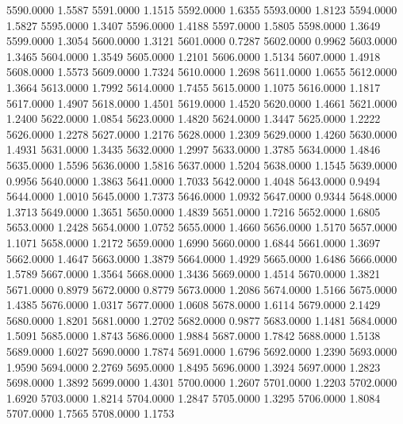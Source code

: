 5590.0000      1.5587
5591.0000      1.1515
5592.0000      1.6355
5593.0000      1.8123
5594.0000      1.5827
5595.0000      1.3407
5596.0000      1.4188
5597.0000      1.5805
5598.0000      1.3649
5599.0000      1.3054
5600.0000      1.3121
5601.0000      0.7287
5602.0000      0.9962
5603.0000      1.3465
5604.0000      1.3549
5605.0000      1.2101
5606.0000      1.5134
5607.0000      1.4918
5608.0000      1.5573
5609.0000      1.7324
5610.0000      1.2698
5611.0000      1.0655
5612.0000      1.3664
5613.0000      1.7992
5614.0000      1.7455
5615.0000      1.1075
5616.0000      1.1817
5617.0000      1.4907
5618.0000      1.4501
5619.0000      1.4520
5620.0000      1.4661
5621.0000      1.2400
5622.0000      1.0854
5623.0000      1.4820
5624.0000      1.3447
5625.0000      1.2222
5626.0000      1.2278
5627.0000      1.2176
5628.0000      1.2309
5629.0000      1.4260
5630.0000      1.4931
5631.0000      1.3435
5632.0000      1.2997
5633.0000      1.3785
5634.0000      1.4846
5635.0000      1.5596
5636.0000      1.5816
5637.0000      1.5204
5638.0000      1.1545
5639.0000      0.9956
5640.0000      1.3863
5641.0000      1.7033
5642.0000      1.4048
5643.0000      0.9494
5644.0000      1.0010
5645.0000      1.7373
5646.0000      1.0932
5647.0000      0.9344
5648.0000      1.3713
5649.0000      1.3651
5650.0000      1.4839
5651.0000      1.7216
5652.0000      1.6805
5653.0000      1.2428
5654.0000      1.0752
5655.0000      1.4660
5656.0000      1.5170
5657.0000      1.1071
5658.0000      1.2172
5659.0000      1.6990
5660.0000      1.6844
5661.0000      1.3697
5662.0000      1.4647
5663.0000      1.3879
5664.0000      1.4929
5665.0000      1.6486
5666.0000      1.5789
5667.0000      1.3564
5668.0000      1.3436
5669.0000      1.4514
5670.0000      1.3821
5671.0000      0.8979
5672.0000      0.8779
5673.0000      1.2086
5674.0000      1.5166
5675.0000      1.4385
5676.0000      1.0317
5677.0000      1.0608
5678.0000      1.6114
5679.0000      2.1429
5680.0000      1.8201
5681.0000      1.2702
5682.0000      0.9877
5683.0000      1.1481
5684.0000      1.5091
5685.0000      1.8743
5686.0000      1.9884
5687.0000      1.7842
5688.0000      1.5138
5689.0000      1.6027
5690.0000      1.7874
5691.0000      1.6796
5692.0000      1.2390
5693.0000      1.9590
5694.0000      2.2769
5695.0000      1.8495
5696.0000      1.3924
5697.0000      1.2823
5698.0000      1.3892
5699.0000      1.4301
5700.0000      1.2607
5701.0000      1.2203
5702.0000      1.6920
5703.0000      1.8214
5704.0000      1.2847
5705.0000      1.3295
5706.0000      1.8084
5707.0000      1.7565
5708.0000      1.1753
